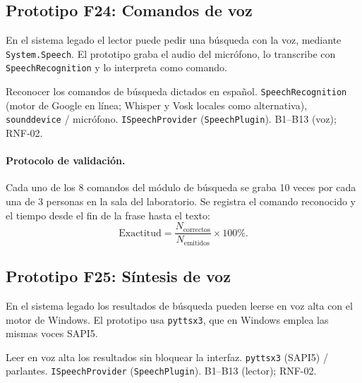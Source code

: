 \subsection{Prototipo F24: Comandos de voz}

En el sistema legado \citep{montanares2019} el lector puede pedir una búsqueda con la voz, mediante \texttt{System.Speech}. El prototipo graba el audio del micrófono, lo transcribe con \texttt{SpeechRecognition} y lo interpreta como comando.

{Reconocer los comandos de búsqueda dictados en español.}
{\texttt{SpeechRecognition} (motor de Google en línea; Whisper y Vosk locales como alternativa), \texttt{sounddevice} / micrófono.}
{\texttt{ISpeechProvider} (\texttt{SpeechPlugin}).}
{B1--B13 (voz); RNF-02.}
{ }

\paragraph{Protocolo de validación.} Cada uno de los 8 comandos del módulo de búsqueda se graba 10 veces por cada una de 3 personas en la sala del laboratorio. Se registra el comando reconocido y el tiempo desde el fin de la frase hasta el texto:
\begin{equation}
\mathrm{Exactitud}=\frac{N_{\text{correctos}}}{N_{\text{emitidos}}}\times100\%.
\end{equation}

\subsection{Prototipo F25: Síntesis de voz}

En el sistema legado \citep{montanares2019} los resultados de búsqueda pueden leerse en voz alta con el motor de Windows. El prototipo usa \texttt{pyttsx3}, que en Windows emplea las mismas voces SAPI5.

{Leer en voz alta los resultados sin bloquear la interfaz.}
{\texttt{pyttsx3} (SAPI5) / parlantes.}
{\texttt{ISpeechProvider} (\texttt{SpeechPlugin}).}
{B1--B13 (lector); RNF-02.}
{ }

